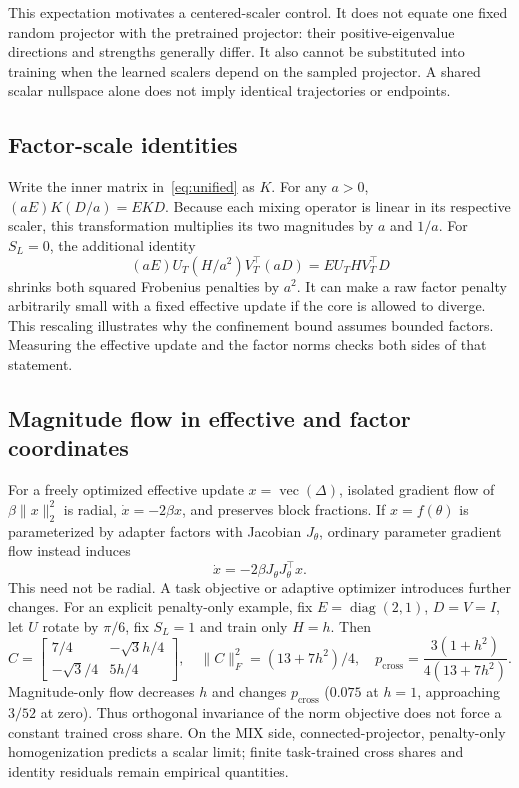 \documentclass{article}
\newcommand{\cross}{\mathrm{cross}}
\newcommand{\diag}{\operatorname{diag}}
\begin{document}
This expectation motivates a centered-scaler control. It does not equate one fixed random projector with the pretrained projector: their positive-eigenvalue directions and strengths generally differ. It also cannot be substituted into training when the learned scalers depend on the sampled projector. A shared scalar nullspace alone does not imply identical trajectories or endpoints.

\subsection{Factor-scale identities}
\label{app:factorscale}
Write the inner matrix in~\eqref{eq:unified} as $K$. For any $a>0$, $(aE)K(D/a)=EKD$. Because each mixing operator is linear in its respective scaler, this transformation multiplies its two magnitudes by $a$ and $1/a$. For $S_L=0$, the additional identity
\begin{equation}
(aE)U_T(H/a^2)V_T^\top(aD)=E U_T H V_T^\top D
\end{equation}
shrinks both squared Frobenius penalties by $a^2$. It can make a raw factor penalty arbitrarily small with a fixed effective update if the core is allowed to diverge. This rescaling illustrates why the confinement bound assumes bounded factors. Measuring the effective update and the factor norms checks both sides of that statement.
\subsection{Magnitude flow in effective and factor coordinates}
\label{app:factorflow}
For a freely optimized effective update $x=\operatorname{vec}(\Delta)$, isolated gradient flow of $\beta\|x\|_2^2$ is radial, $\dot x=-2\beta x$, and preserves block fractions. If $x=f(\theta)$ is parameterized by adapter factors with Jacobian $J_\theta$, ordinary parameter gradient flow instead induces
\begin{equation}
\dot x=-2\beta J_\theta J_\theta^\top x.
\end{equation}
This need not be radial. A task objective or adaptive optimizer introduces further changes. For an explicit penalty-only example, fix $E=\diag(2,1)$, $D=V=I$, let $U$ rotate by $\pi/6$, fix $S_L=1$ and train only $H=h$. Then
\begin{equation}
C=\begin{bmatrix}7/4&-\sqrt3h/4\\-\sqrt3/4&5h/4\end{bmatrix},\quad
\|C\|_F^2=(13+7h^2)/4,\quad
p_\cross=\frac{3(1+h^2)}{4(13+7h^2)}.
\end{equation}
Magnitude-only flow decreases $h$ and changes $p_\cross$ ($0.075$ at $h=1$, approaching $3/52$ at zero). Thus orthogonal invariance of the norm objective does not force a constant trained cross share. On the MIX side, connected-projector, penalty-only homogenization predicts a scalar limit; finite task-trained cross shares and identity residuals remain empirical quantities.
\end{document}

